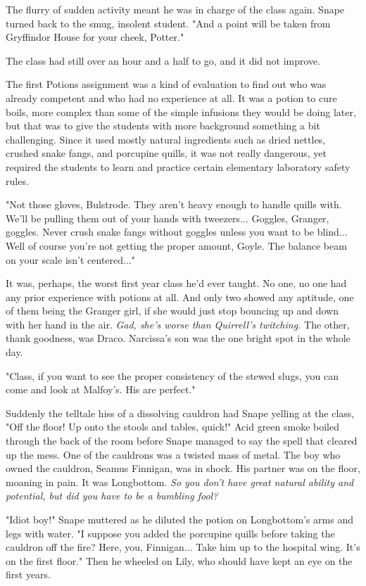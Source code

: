 \documentclass[a4paper,11pt]{article}
\begin{document}
The flurry of sudden activity meant he was in charge of the class again. Snape turned back to the smug, insolent student. "And a point will be taken from Gryffindor House for your cheek, Potter."

The class had still over an hour and a half to go, and it did not improve.

The first Potions assignment was a kind of evaluation to find out who was already competent and who had no experience at all. It was a potion to cure boils, more complex than some of the simple infusions they would be doing later, but that was to give the students with more background something a bit challenging. Since it used mostly natural ingredients such as dried nettles, crushed snake fangs, and porcupine quills, it was not really dangerous, yet required the students to learn and practice certain elementary laboratory safety rules.

"Not those gloves, Bulstrode. They aren't heavy enough to handle quills with. We'll be pulling them out of your hands with tweezers... Goggles, Granger, goggles. Never crush snake fangs without goggles unless you want to be blind... Well of course you're not getting the proper amount, Goyle. The balance beam on your scale isn't centered..."

It was, perhaps, the worst first year class he'd ever taught. No one, no one had any prior experience with potions at all. And only two showed any aptitude, one of them being the Granger girl, if she would just stop bouncing up and down with her hand in the air. \emph{Gad, she's worse than Quirrell's twitching.} The other, thank goodness, was Draco. Narcissa's son was the one bright spot in the whole day.

"Class, if you want to see the proper consistency of the stewed slugs, you can come and look at Malfoy's. His are perfect."

Suddenly the telltale hiss of a dissolving cauldron had Snape yelling at the class, "Off the floor! Up onto the stools and tables, quick!" Acid green smoke boiled through the back of the room before Snape managed to say the spell that cleared up the mess. One of the cauldrons was a twisted mass of metal. The boy who owned the cauldron, Seamus Finnigan, was in shock. His partner was on the floor, moaning in pain. It was Longbottom. \emph{So you don't have great natural ability and potential, but did you have to be a bumbling fool?}

"Idiot boy!" Snape muttered as he diluted the potion on Longbottom's arms and legs with water. "I suppose you added the porcupine quills before taking the cauldron off the fire? Here, you, Finnigan... Take him up to the hospital wing. It's on the first floor." Then he wheeled on Lily, who should have kept an eye on the first years.
\end{document}
